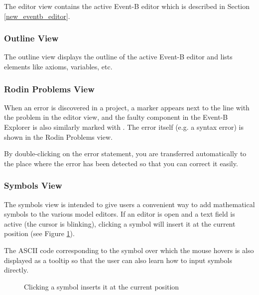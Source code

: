 The editor view contains the active Event-B editor which is described in Section \ref{new_eventb_editor}.

\subsubsection{Outline View}
\label{outline_view}

The outline view displays the outline of the active Event-B editor and lists elements like axioms, variables, etc. 

\subsubsection{Rodin Problems View}
\label{rodin_problems_view}

When an error is discovered in a project, a  marker appears next to the line with the problem in the editor view, and the faulty component in the \textsf{Event-B Explorer} is also similarly marked with . The error itself (e.g. a syntax error) is shown in the Rodin Problems view.

By double-clicking on the error statement, you are transferred automatically to the place where the error has been detected so that you can correct it easily.

\subsubsection{Symbols View}
\label{symbols_view}

The symbols view is intended to give users a convenient way to add mathematical symbols to the various model editors. If an editor is open and a text field is active (the cursor is blinking), clicking a symbol will insert it at the current position (see Figure \ref{fig_ref_01_symbol_table1}). 

The ASCII code corresponding to the symbol over which the mouse hovers is also displayed as a tooltip so that the user can also learn how to input symbols directly. 

\begin{figure}[!ht]
\begin{center}
	\caption{Clicking a symbol inserts it at the current position}
	\label{fig_ref_01_symbol_table1}
\end{center}
\end{figure}

